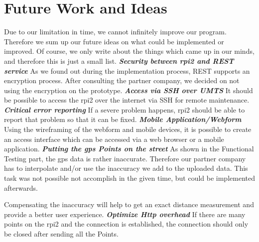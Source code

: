 \chapter{Future Work and Ideas}
Due to our limitation in time, we cannot infinitely improve our program. Therefore we sum up our future ideas on what could be implemented or improved. Of course, we only write about the things which came up in our minds, and therefore this is just a small list.
\newline \newline
\textbf{\textit{Security between \gls{rpi2} and REST service}} \newline
As we found out during the implementation process, REST supports an encryption process. After consulting the partner company, we decided on not using the encryption on the prototype.
\newline \newline
\textbf{\textit{Access via SSH over UMTS}}
\newline
It should be possible to access the \gls{rpi2} over the internet via SSH for remote maintenance.
\newline \newline
\textbf{\textit{Critical error reporting}}
\newline
If a severe problem happens, \gls{rpi2} should be able to report that problem so that it can be fixed.
\newline \newline
\textbf{\textit{Mobile Application/Webform}}
\newline
Using the wireframing of the webform and mobile devices, it is possible to create an access interface which can be accessed via a web browser or a mobile application.
\newline \newline
\textbf{\textit{Putting the \gls{gps} Points on the street}}
\newline
As shown in the Functional Testing part, the \gls{gps} data is rather inaccurate. Therefore our partner company has to interpolate and/or use the inaccuracy we add to the uploaded data. This task was not possible not accomplish in the given time, but could be implemented afterwards.

Compensating the inaccuracy will help to get an exact distance measurement and provide a better user experience.
\newline \newline
\textbf{\textit{Optimize Http overhead}}
\newline
If there are many points on the \gls{rpi2}  and the connection is established, the connection should only be closed after sending all the Points.
